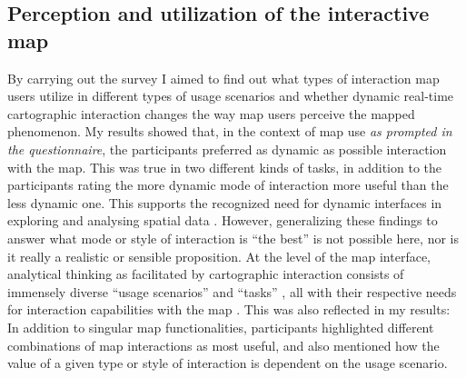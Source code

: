 




\subsection{Perception and utilization of the interactive map}

By carrying out the survey I aimed to find out what types of interaction
map users utilize in different types of usage scenarios
and whether dynamic real-time cartographic interaction changes the way
map users perceive the mapped phenomenon.
My results showed that, in the context of map use \textit{as prompted in the questionnaire},
the participants preferred as dynamic as possible interaction with the map.
This was true in two different kinds of tasks,
in addition to the participants rating the more dynamic mode of interaction
more useful than the less dynamic one.
This supports the recognized need for dynamic interfaces in exploring and analysing
spatial data \parencite{eds2008, but2018}.
However, generalizing these findings to answer what mode or style of interaction is
\enquote{the best} is not possible here,
nor is it really a realistic or sensible proposition.
At the level of the map interface, analytical thinking as facilitated by cartographic interaction
consists of immensely diverse \enquote{usage scenarios} and \enquote{tasks}
\parencite{rob2017b, and2010},
all with their respective needs for interaction capabilities with the map
\parencite{rot2013a, rot2015}.
This was also reflected in my results:
In addition to singular map functionalities,
participants highlighted different combinations of map interactions as most useful,
and also mentioned how the value of a given type or style of interaction is
dependent on the usage scenario.  %

